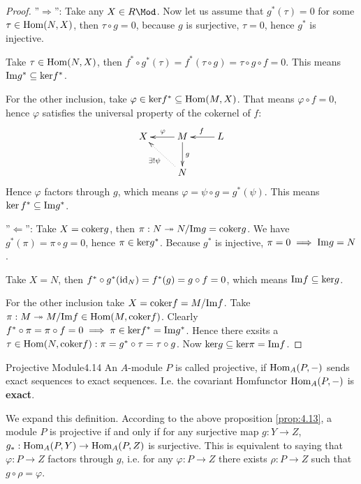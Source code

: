 \documentclass[twoside = false,	%
		headsepline,		%
		parskip = true,
		]{scrbook}						%
\begin{document}
        \begin{proof}
        ''$\Rightarrow$'': Take any $X \in R\Mod$. Now let us assume that $g^*(\tau) = 0$ for some $\tau \in \mathrm{Hom}(N,X)$,
        then $\tau \circ g = 0$, because $g$ is surjective, $\tau = 0$, hence $g^*$ is injective.

        Take $\tau \in \mathrm{Hom}(N,X)$, then $f^* \circ g^* (\tau) = f^*(\tau \circ g) = \tau \circ g \circ f = 0$.
        This means $\mathrm{Im} g^* \subseteq \mathrm{ker} f^*$.

        For the other inclusion, take $\varphi \in \mathrm{ker} f^* \subseteq \mathrm{Hom}(M,X)$. That means $\varphi \circ f = 0$,
        hence $\varphi$ satisfies the universal property of the cokernel of $f$:
        \begin{equation*}
        \xymatrix {
            X & M \ar[l]_{\varphi} \ar[d]^{g} & \ar[l]_{f} L \\
            & N \ar@{.>}[ul]^{\exists ! \psi} & 
        }
        \end{equation*}
        Hence $\varphi$ factors through $g$, which means $\varphi = \psi \circ g = g^*(\psi)$.
        This means $\ker f^* \subseteq \mathrm{Im} g^* $.

        ''$\Leftarrow$'': Take $X = \mathrm{coker} g$, then $\pi: N \twoheadrightarrow N/\mathrm{Im} g = \mathrm{coker} g$.
        We have $g^*(\pi) = \pi \circ g = 0$, hence $\pi \in \mathrm{ker} g^* $.
        Because $g^*$ is injective, $\pi = 0 \implies \mathrm{Im} g = N$.

        Take $X = N$, then $f^* \circ g^* (\mathrm{id}_N) = f^* (g) = g \circ f = 0$,
        which means $\mathrm{Im} f \subseteq \mathrm{ker} g$.

        For the other inclusion take $X = \mathrm{coker} f = M/\mathrm{Im} f$. Take $\pi: M \twoheadrightarrow M/\mathrm{Im} f \in \mathrm{Hom}(M,\mathrm{coker} f)$.
        Clearly $f^* \circ \pi = \pi \circ f = 0 \implies \pi \in \mathrm{ker} f^* = \mathrm{Im} g^*$. Hence there exsits a $\tau \in \mathrm{Hom}(N,\mathrm{coker} f): \pi = g^* \circ \tau = \tau \circ g$.
        Now $\mathrm{ker} g \subseteq \mathrm{ker} \pi  = \mathrm{Im} f $. 
    \end{proof}

    \begin{definition}{Projective Module}{4.14}
        An $A$-module $P$ is called projective, if $\mathrm{Hom}_A(P,-)$ sends exact sequences to exact sequences. I.e. the covariant Homfunctor $\mathrm{Hom}_A(P,-)$ is \textbf{exact}.
    \end{definition}

    We expand this definition. According to the above proposition \ref{prop:4.13}, a module $P$ is projective if and only if for any surjective map $g: Y \to Z$, $g_*: \mathrm{Hom}_A(P,Y) \to \mathrm{Hom}_A(P,Z)$ is surjective. This is equivalent to saying that $\varphi: P \to Z$ factors through $g$, i.e. for any $\varphi: P \to Z$ there exists $\rho:P \to Z$ such that $g \circ \rho = \varphi$.
\end{document}
